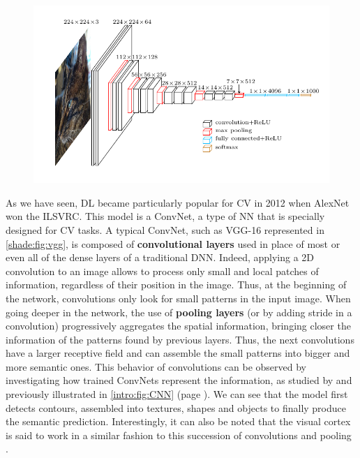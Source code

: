 \begin{figure}[tb]
	\centering
	\includegraphics[width=\linewidth]{images/intro_vgg}
	\label{shade:fig:vgg}
\end{figure}

As we have seen, \acf{DL} became particularly popular for \acf{CV} in 2012 when AlexNet \citep{alexnet} won the \acf{ILSVRC}. This model is a \acf{ConvNet}, a type of \ac{NN} that is specially designed for \ac{CV} tasks. A typical \ac{ConvNet}, such as VGG-16 \citep{simonyan2015very} represented in \autoref{shade:fig:vgg}, is composed of \textbf{convolutional layers} used in place of most or even all of the dense layers of a traditional \ac{DNN}. Indeed, applying a 2D convolution to an image allows to process only small and local patches of information, regardless of their position in the image. Thus, at the beginning of the network, convolutions only look for small patterns in the input image. When going deeper in the network, the use of \textbf{pooling layers} (or by adding stride in a convolution) progressively aggregates the spatial information, bringing closer the information of the patterns found by previous layers. Thus, the next convolutions have a larger receptive field \citep{luo2016understanding} and can assemble the small patterns into bigger and more semantic ones. This behavior of convolutions can be observed by investigating how trained \acp{ConvNet} represent the information, as studied by \citet{olah2017feature} and previously illustrated in \autoref{intro:fig:CNN} (page \pageref{intro:fig:CNN}). We can see that the model first detects contours, assembled into textures, shapes and objects to finally produce the semantic prediction. Interestingly, it can also be noted that the visual cortex is said to work in a similar fashion to this succession of convolutions and pooling \citep{hubel1962receptive}.

